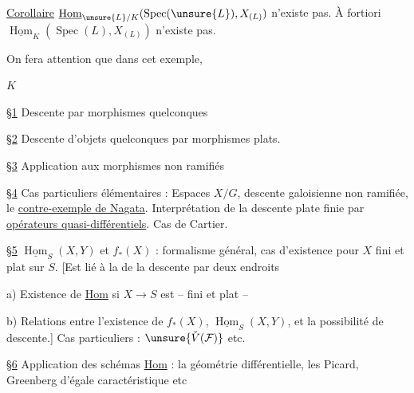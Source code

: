 \uline{Corollaire} $\underline{\operatorname{Hom}}_{\unsure{L}/K}(\operatorname{Spec}(\unsure{L}),X_{(L)})$ n'existe pas. À fortiori $\underline{\operatorname{Hom}}_K(\operatorname{Spec}(L),X_{(L)})$ n'existe pas.

On fera attention que dans cet exemple,

$K$


\uline{\S1} Descente  par morphismes quelconques

\uline{\S2} Descente d'objets quelconques par morphismes plats.

\uline{\S3} Application  aux morphismes non ramifiés

\uline{\S4} Cas particuliers élémentaires : Espaces $X/G$, descente galoisienne non ramifiée, le \uline{contre-exemple de Nagata}. Interprétation de la descente plate finie par \uline{opérateurs quasi-différentiels}. Cas de Cartier.

\uline{\S5} $\underline{\operatorname{Hom}}_S(X,Y)$ et $f_*(X)$ : formalisme général, cas d'existence pour $X$ fini et plat sur $S$. [Est lié à la  de la descente  par deux endroits

a) Existence de \uline{Hom} si $X\to S$ est  -- fini et plat --

b) Relations entre l'existence de $f_*(X)$, $\underline{\operatorname{Hom}}_S(X,Y)$, et la possibilité de descente.] Cas particuliers : $\unsure{\check V(\mathcal F)}$ etc.

\uline{\S6} Application des schémas \uline{Hom} : la géométrie différentielle, les Picard, Greenberg d'égale caractéristique etc

